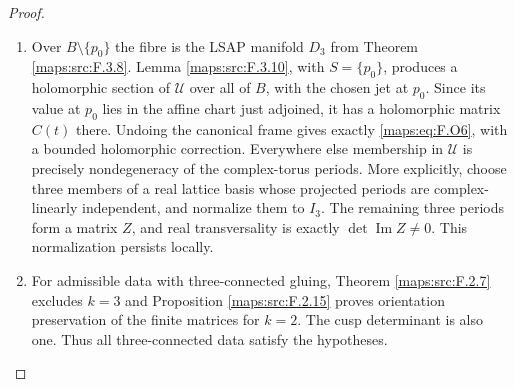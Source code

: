 \begin{proof}
\begin{enumerate}[label={$\langle1\rangle$\arabic*.}]
\item Over $B\setminus\{p_0\}$ the fibre is the LSAP manifold
$D_3$ from Theorem \ref{maps:src:F.3.8}.  Lemma \ref{maps:src:F.3.10}, with $S=\{p_0\}$,
produces a holomorphic section of $\mathscr U$ over all of
$B$, with the chosen jet at $p_0$.  Since its value at $p_0$
lies in the affine chart just adjoined, it has a holomorphic
matrix $C(t)$ there.  Undoing the canonical frame gives
exactly \eqref{maps:eq:F.O6}, with a bounded holomorphic correction.
Everywhere else membership in $\mathscr U$ is precisely
nondegeneracy of the complex-torus periods.
More explicitly, choose three members of a real lattice basis
whose projected periods are complex-linearly independent, and
normalize them to $I_3$.  The remaining three periods form a
matrix $Z$, and real transversality is exactly
$\det\operatorname{Im}Z\ne0$.  This normalization persists
locally.  

\item For admissible data with three-connected gluing, Theorem \ref{maps:src:F.2.7} excludes $k=3$ and
Proposition \ref{maps:src:F.2.15} proves orientation preservation of the
finite matrices for $k=2$.  The cusp determinant is also one.
Thus all three-connected data satisfy the hypotheses.  

\end{enumerate}
\end{proof}





\clearpage
